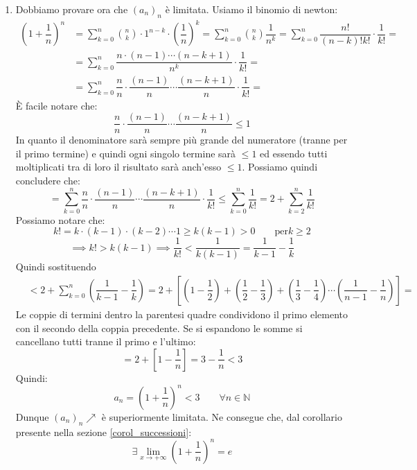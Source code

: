 {\begin{enumerate}
    \item Dobbiamo provare ora che $(a_n)_n$ è limitata. Usiamo il binomio di newton:
    \begin{align*}
        (1+\dfrac{1}{n})^n &= \sum_{k = 0}^{n} \binom{n}{k} \cdot 1^{n-k} \cdot \left(\dfrac{1}{n}\right)^k = \sum_{k = 0}^{n} \binom{n}{k}\dfrac{1}{n^k} = \sum_{k = 0}^{n} \dfrac{n!}{(n-k)!k!}\cdot\dfrac{1}{k!}=\\
        &= \sum_{k = 0}^{n} \dfrac{n \cdot (n-1) \cdots (n-k+1)}{n^k} \cdot \dfrac{1}{k!} =\\
        &= \sum_{k = 0}^{n} \dfrac{n}{n} \cdot \dfrac{(n-1)}{n} \cdots \dfrac{(n-k+1)}{n} \cdot \dfrac{1}{k!} =
    \end{align*}
        È facile notare che:
    \begin{equation*}
        \dfrac{n}{n} \cdot \dfrac{(n-1)}{n} \cdots \dfrac{(n-k+1)}{n} \leq 1
    \end{equation*}
    In quanto il denominatore sarà sempre più grande del numeratore (tranne per il primo termine) e quindi ogni singolo termine sarà $\leq 1$ ed essendo tutti moltiplicati tra di loro il risultato sarà anch'esso $\leq 1$. Possiamo quindi concludere che:
    \begin{equation*}
        = \sum_{k = 0}^{n} \dfrac{n}{n} \cdot \dfrac{(n-1)}{n} \cdots \dfrac{(n-k+1)}{n} \cdot \dfrac{1}{k!} \leq \sum_{k = 0}^{n} \dfrac{1}{k!} = 2 + \sum_{k = 2}^{n} \dfrac{1}{k!}
    \end{equation*}
    Possiamo notare che:
    \begin{equation*}
        k! = k\cdot (k-1)\cdot (k-2) \cdots 1 \geq k (k-1) > 0 \qquad \text{per} k\geq 2
    \end{equation*}
    \begin{equation*}
        \implies k! > k(k-1) \implies \dfrac{1}{k!} < \dfrac{1}{k(k-1)} = \dfrac{1}{k-1} - \dfrac{1}{k}
    \end{equation*}
    Quindi sostituendo
    \begin{align*}
        &< 2 + \sum_{k = 0}^{n} \left(\dfrac{1}{k-1} - \dfrac{1}{k}\right) = 2 + \left[ \left(1-\dfrac{1}{2}\right) + \left(\dfrac{1}{2}-\dfrac{1}{3}\right) + \left(\dfrac{1}{3}-\dfrac{1}{4}\right) \cdots \left(\dfrac{1}{n-1}-\dfrac{1}{n}\right)\right]=
    \end{align*}
    Le coppie di termini dentro la parentesi quadre condividono il primo elemento con il secondo della coppia precedente. Se si espandono le somme si cancellano tutti tranne il primo e l'ultimo:
    \begin{equation*}
        = 2 + \left[1 - \dfrac{1}{n}\right] = 3 -\dfrac{1}{n} < 3
    \end{equation*}
    Quindi:
    \begin{equation*}
        a_n = \left(1+\dfrac{1}{n}\right)^{n} < 3 \qquad \forall n \in \mathbb{N}
    \end{equation*}
    Dunque $(a_n)_n \nearrow$ è superiormente limitata. Ne consegue che, dal corollario presente nella sezione \ref{corol_successioni}:
    \begin{equation*}
        \exists \lim_{x\to + \infty} \left(1+\dfrac{1}{n}\right)^n = e
    \end{equation*}
\end{enumerate}
}
